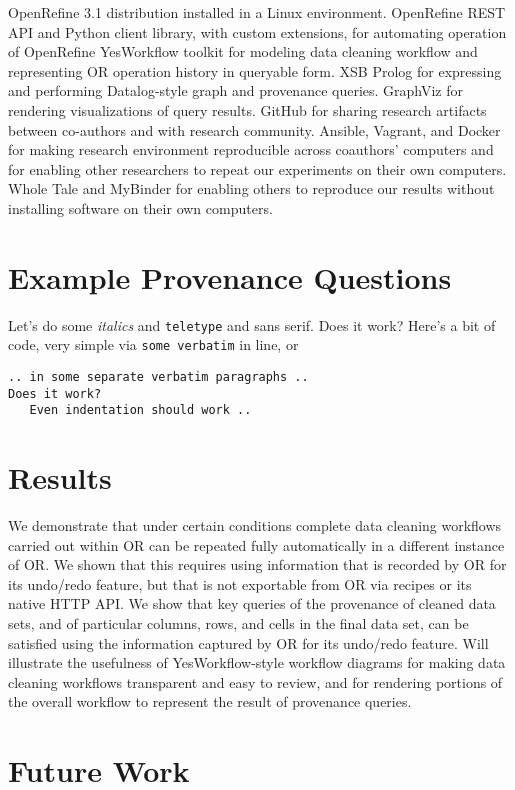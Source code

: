 \documentclass[sigconf,screen,nonacm]{acmart}
\begin{document}
OpenRefine 3.1 distribution installed in a Linux environment.
OpenRefine REST API and Python client library, with custom extensions, for automating operation of OpenRefine
YesWorkflow toolkit for modeling data cleaning workflow and representing OR operation history in queryable form.
XSB Prolog for expressing and performing Datalog-style graph and provenance queries.
GraphViz for rendering visualizations of query results.
GitHub for sharing research artifacts between co-authors and with research community.
Ansible, Vagrant, and Docker for making research environment reproducible across coauthors' computers and for enabling other researchers to repeat our experiments on their own computers.
Whole Tale and MyBinder for enabling others to reproduce our results without installing software on their own computers. 

\section{Example Provenance Questions}

Let's do some \emph{italics} and \texttt{teletype} and \textsf{sans
  serif}. Does it work?
Here's a bit of code, very simple via \verb|some verbatim| in line, or
\begin{verbatim}
.. in some separate verbatim paragraphs ..
Does it work?
   Even indentation should work .. 
\end{verbatim}

\section{Results}

We demonstrate that under certain conditions complete data cleaning workflows carried out within OR can be repeated fully automatically in a different instance of OR.  We shown that this requires using information that is recorded by OR for its undo/redo feature, but that is not exportable from OR via recipes or its native HTTP API.
We show that key queries of the provenance of cleaned data sets, and of particular columns, rows, and cells in the final data set, can be satisfied using the information captured by OR for its undo/redo feature.
Will illustrate the usefulness of YesWorkflow-style workflow diagrams for making data cleaning workflows transparent and easy to review, and for rendering portions of the overall workflow to represent the result of provenance queries.

\section{Future Work}



%


\end{document}
